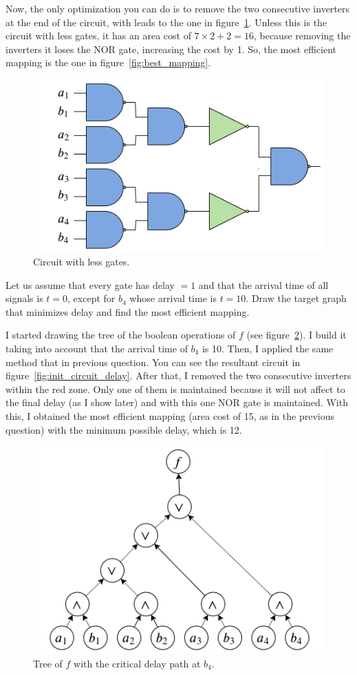 \documentclass[a4paper, 10pt]{article}
\begin{document}
Now, the only optimization you can do is to remove the two consecutive inverters at the end of the circuit, with leads to the one in figure~\ref{fig:last_circuit}. Unless this is the circuit with less gates, it has an area cost of $7\times2 + 2 = 16$, because removing the inverters it loses the NOR gate, increasing the cost by 1. So, the most efficient mapping is the one in figure~\ref{fig:best_mapping}.

\begin{figure}[htbp]
    \centering
    \includegraphics[width=0.5\linewidth]{3_2_4.png}
    \caption{Circuit with less gates.}
    \label{fig:last_circuit}
\end{figure}

{\color{statement} Let us assume that every gate has delay $=1$ and that the arrival time of all signals is $t = 0$, except for $b_4$ whose arrival time is $t = 10$. Draw the target graph that minimizes delay and find the most efficient mapping.}

I started drawing the tree of the boolean operations of $f$ (see figure~\ref{fig:tree_f_delay}). I build it taking into account that the arrival time of $b_4$ is 10. Then, I applied the same method that in previous question. You can see the resultant circuit in figure~\ref{fig:init_circuit_delay}. After that, I removed the two consecutive inverters within the red zone. Only one of them is maintained because it will not affect to the final delay (as I show later) and with this one NOR gate is maintained. With this, I obtained the most efficient mapping (area cost of 15, as in the previous question) with the minimum possible delay, which is 12.

\begin{figure}[htbp]
    \centering
    \includegraphics[width=0.5\linewidth]{3_3_1.png}
    \caption{Tree of $f$ with the critical delay path at $b_4$.}
    \label{fig:tree_f_delay}
\end{figure}
\end{document}
